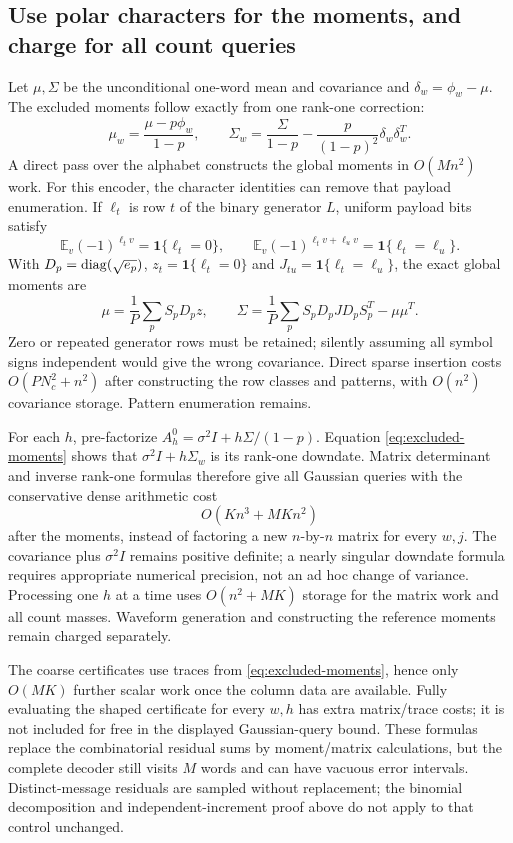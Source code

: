 \documentclass[10pt,a4paper]{article}
\newcommand{\E}{\mathbb E}
\newcommand{\ind}{\mathbf 1}
\begin{document}
\subsection{Use polar characters for the moments, and charge for all count queries}
Let $\mu,\Sigma$ be the unconditional one-word mean and covariance and $\delta_w=\phi_w-\mu$.
The excluded moments follow exactly from one rank-one correction:
\begin{equation}
 \mu_w=\frac{\mu-p\phi_w}{1-p},\qquad
 \Sigma_w=\frac{\Sigma}{1-p}
          -\frac{p}{(1-p)^2}\delta_w\delta_w^T.
 \label{eq:excluded-moments}
\end{equation}
A direct pass over the alphabet constructs the global moments in $O(Mn^2)$ work. For this encoder, the
character identities can remove that payload enumeration. If $\ell_t$ is row $t$ of the binary generator $L$,
uniform payload bits satisfy
\[
 \E_v(-1)^{\ell_t v}=\ind\{\ell_t=0\},\qquad
 \E_v(-1)^{\ell_t v+\ell_u v}=\ind\{\ell_t=\ell_u\}.
\]
With $D_p=\operatorname{diag}(\sqrt{e_p})$, $z_t=\ind\{\ell_t=0\}$ and
$J_{tu}=\ind\{\ell_t=\ell_u\}$, the exact global moments are
\[
 \mu=\frac1P\sum_pS_pD_pz,\qquad
 \Sigma=\frac1P\sum_pS_pD_pJD_pS_p^T-\mu\mu^T.
\]
Zero or repeated generator rows must be retained; silently assuming all symbol signs independent would
give the wrong covariance. Direct sparse insertion costs $O(PN_c^2+n^2)$ after constructing the row classes
and patterns, with $O(n^2)$ covariance storage. Pattern enumeration remains.

For each $h$, pre-factorize $A_h^0=\sigma^2I+h\Sigma/(1-p)$. Equation \eqref{eq:excluded-moments} shows that
$\sigma^2I+h\Sigma_w$ is its rank-one downdate. Matrix determinant and inverse rank-one formulas therefore
give all Gaussian queries with the conservative dense arithmetic cost
\[
 O(Kn^3+MKn^2)
\]
after the moments, instead of factoring a new $n$-by-$n$ matrix for every $w,j$. The covariance plus
$\sigma^2I$ remains positive definite; a nearly singular downdate formula requires appropriate numerical
precision, not an ad hoc change of variance. Processing one $h$ at a time uses $O(n^2+MK)$ storage for
the matrix work and all count masses. Waveform generation and constructing the reference moments remain
charged separately.

The coarse certificates use traces from \eqref{eq:excluded-moments}, hence only $O(MK)$ further scalar work
once the column data are available. Fully evaluating the shaped certificate for every $w,h$ has extra
matrix/trace costs; it is not included for free in the displayed Gaussian-query bound. These formulas replace
the combinatorial residual sums by moment/matrix calculations, but the complete decoder still visits
$M$ words and can have vacuous error intervals. Distinct-message residuals are sampled without replacement;
the binomial decomposition and independent-increment proof above do not apply to that control unchanged.
\end{document}

